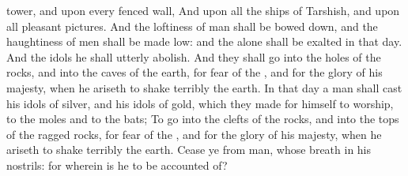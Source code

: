 {tower, and upon every
fenced
wall,
And upon all the
ships of
Tarshish, and upon all
pleasant
pictures.
And the
loftiness of
man shall be bowed
down, and the
haughtiness of
men shall be made
low: and the
{} alone shall be
exalted in that
day.
And the
idols he shall
utterly
abolish.
And they shall
go into the
holes of the
rocks, and into the
caves of the
earth,
for
fear of the
{}, and for the
glory of his
majesty, when he
ariseth to shake
terribly the
earth.
In that
day a
man shall
cast his
idols of
silver, and his
idols of
gold, which they made
{} for
himself to
worship, to the
moles and to the
bats;
To
go into the
clefts of the
rocks, and into the
tops of the ragged
rocks,
for
fear of the
{}, and for the
glory of his
majesty, when he
ariseth to shake
terribly the
earth.
Cease ye from
man, whose
breath
{} in his
nostrils: for wherein is he to be accounted
of?

}
